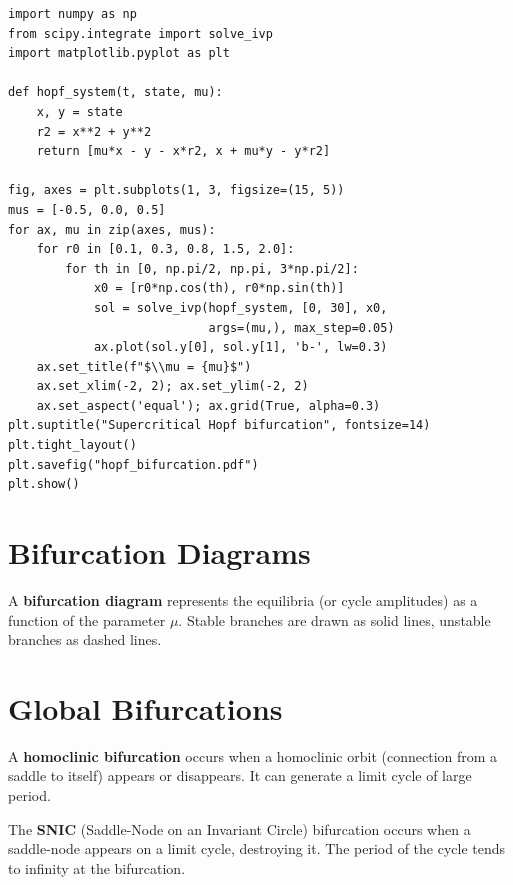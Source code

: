 \begin{codeblock}[title=\textbf{Bifurcation diagram and Hopf}]
\begin{verbatim}
import numpy as np
from scipy.integrate import solve_ivp
import matplotlib.pyplot as plt

def hopf_system(t, state, mu):
    x, y = state
    r2 = x**2 + y**2
    return [mu*x - y - x*r2, x + mu*y - y*r2]

fig, axes = plt.subplots(1, 3, figsize=(15, 5))
mus = [-0.5, 0.0, 0.5]
for ax, mu in zip(axes, mus):
    for r0 in [0.1, 0.3, 0.8, 1.5, 2.0]:
        for th in [0, np.pi/2, np.pi, 3*np.pi/2]:
            x0 = [r0*np.cos(th), r0*np.sin(th)]
            sol = solve_ivp(hopf_system, [0, 30], x0,
                            args=(mu,), max_step=0.05)
            ax.plot(sol.y[0], sol.y[1], 'b-', lw=0.3)
    ax.set_title(f"$\\mu = {mu}$")
    ax.set_xlim(-2, 2); ax.set_ylim(-2, 2)
    ax.set_aspect('equal'); ax.grid(True, alpha=0.3)
plt.suptitle("Supercritical Hopf bifurcation", fontsize=14)
plt.tight_layout()
plt.savefig("hopf_bifurcation.pdf")
plt.show()
\end{verbatim}
\end{codeblock}

\section{Bifurcation Diagrams}

\begin{definition}
A \textbf{bifurcation diagram} represents the equilibria (or cycle
amplitudes) as a function of the parameter $\mu$. Stable branches are drawn
as solid lines, unstable branches as dashed lines.
\end{definition}

\section{Global Bifurcations}

\begin{definition}
A \textbf{homoclinic bifurcation} occurs when a homoclinic orbit (connection
from a saddle to itself) appears or disappears. It can generate a limit
cycle of large period.
\end{definition}

\begin{definition}
The \textbf{SNIC} (Saddle-Node on an Invariant Circle) bifurcation occurs
when a saddle-node appears on a limit cycle, destroying it. The period of the
cycle tends to infinity at the bifurcation.
\end{definition}

